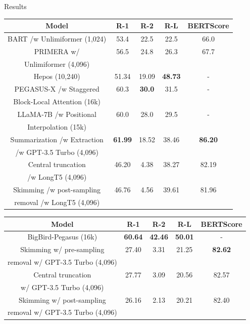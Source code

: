 \documentclass[20pt]{beamer}
\begin{document}
\begin{frame}[t]
\begin{columns}[t]
\begin{block}{Results}
\begin{table}[!ht]
      \begin{tabular}{c c c c c}
        \hline
        Model & R-1 & R-2 & R-L & BERTScore \\
        \hline
        BART /w Unlimiformer (1,024) & 53.4 & 22.5 & 22.5 & 66.0 \\
        PRIMERA w/ & 56.5 & 24.8 & 26.3 & 67.7 \\
        Unlimiformer (4,096) & & & & \\
        Hepos (10,240) & 51.34 & 19.09 & \textbf{48.73} & - \\
        PEGASUS-X /w Staggered & 60.3 & \textbf{30.0} & 31.5 & - \\
        Block-Local Attention (16k) & & & & \\
        LLaMA-7B /w Positional & 60.0 & 28.0 & 29.5 & - \\
        Interpolation (15k) & & & & \\
        \hline
        Summarization /w Extraction & \textbf{61.99} & 18.52 & 38.46 & \textbf{86.20} \\
        /w GPT-3.5 Turbo (4,096) & & & & \\
        Central truncation & 46.20 & 4.38 & 38.27 & 82.19 \\
        /w LongT5 (4,096) & & & & \\
        Skimming /w post-sampling & 46.76 & 4.56 & 39.61 & 81.96 \\
        removal /w LongT5 (4,096) & & & & \\
        \hline
      \end{tabular}
    
      \label{tab:govreport}
    \end{table}
    
    \begin{table}[!t]
      \centering
      \small
    
      \begin{tabular}{c c c c c}
        \hline
        Model & R-1 & R-2 & R-L & BERTScore \\
        \hline
        BigBird-Pegasus (16k) & \textbf{60.64} & \textbf{42.46} & \textbf{50.01} & - \\
        \hline
        Skimming w/ pre-sampling & 27.40 & 3.31 & 21.25 & \textbf{82.62} \\
        removal w/ GPT-3.5 Turbo (4,096) & & & & \\
        Central truncation & 27.77 & 3.09 & 20.56 & 82.57 \\
        w/ GPT-3.5 Turbo (4,096) & & & & \\
        Skimming w/ post-sampling & 26.16 & 2.13 & 20.21 & 82.40 \\
        removal w/ GPT-3.5 Turbo (4,096) & & & & \\
        \hline
      \end{tabular}
    

\end{table}
\end{block}
\end{columns}
\end{frame}
\end{document}
